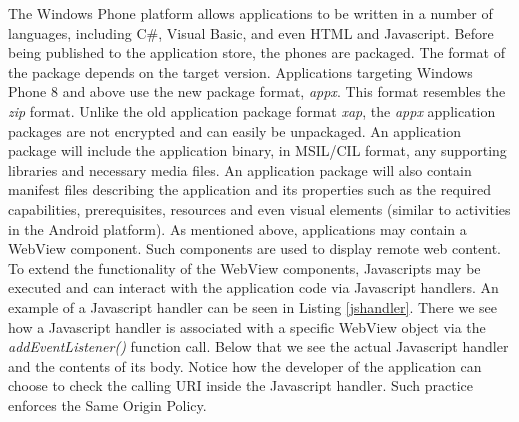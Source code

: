 \documentclass[conference]{IEEEtran}
\begin{document}
The Windows Phone platform allows applications to be written in a number of languages, including C\#, Visual Basic, and even HTML and Javascript.
Before being published to the application store, the phones are packaged.
The format of the package depends on the target version.
Applications targeting Windows Phone 8 and above use the new package format, \textit{appx}.
This format resembles the \textit{zip} format.
Unlike the old application package format \textit{xap}, the \textit{appx} application packages are not encrypted and can easily be unpackaged.
An application package will include the application binary, in MSIL/CIL format, any supporting libraries and necessary media files.
An application package will also contain manifest files describing the application and its properties such as the required capabilities, prerequisites, resources and even visual elements (similar to activities in the Android platform).
As mentioned above, applications may contain a WebView component.
Such components are used to display remote web content.
To extend the functionality of the WebView components, Javascripts may be executed and can interact with the application code via Javascript handlers.
An example of a Javascript handler can be seen in Listing \ref{jshandler}.
There we see how a Javascript handler is associated with a specific WebView object via the \textit{addEventListener()} function call.
Below that we see the actual Javascript handler and the contents of its body.
Notice how the developer of the application can choose to check the calling URI inside the Javascript handler.
Such practice enforces the Same Origin Policy.



 
\lstset{style=mystyle}
 

\end{document}
